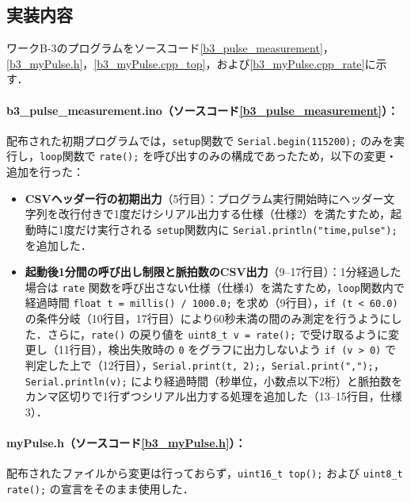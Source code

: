 \subsection{実装内容}

ワークB-3のプログラムをソースコード\ref{b3_pulse_measurement}，\ref{b3_myPulse.h}，\ref{b3_myPulse.cpp_top}，および\ref{b3_myPulse.cpp_rate}に示す．

\paragraph{b3\_pulse\_measurement.ino（ソースコード\ref{b3_pulse_measurement}）：}
配布された初期プログラムでは，\texttt{setup}関数で \texttt{Serial.begin(115200);} のみを実行し，\texttt{loop}関数で \texttt{rate();} を呼び出すのみの構成であったため，以下の変更・追加を行った：
\begin{itemize}
  \item \textbf{CSVヘッダー行の初期出力}（5行目）：プログラム実行開始時にヘッダー文字列を改行付きで1度だけシリアル出力する仕様（仕様2）を満たすため，起動時に1度だけ実行される \texttt{setup}関数内に \texttt{Serial.println("time,pulse");} を追加した．
  \item \textbf{起動後1分間の呼び出し制限と脈拍数のCSV出力}（9--17行目）：1分経過した場合は \texttt{rate} 関数を呼び出さない仕様（仕様4）を満たすため，\texttt{loop}関数内で経過時間 \texttt{float t = millis() / 1000.0;} を求め（9行目），\texttt{if (t < 60.0)} の条件分岐（10行目，17行目）により60秒未満の間のみ測定を行うようにした．さらに，\texttt{rate()} の戻り値を \texttt{uint8\_t v = rate();} で受け取るように変更し（11行目），検出失敗時の \texttt{0} をグラフに出力しないよう \texttt{if (v > 0)} で判定した上で（12行目），\texttt{Serial.print(t, 2);}，\texttt{Serial.print(",");}，\texttt{Serial.println(v);} により経過時間（秒単位，小数点以下2桁）と脈拍数をカンマ区切りで1行ずつシリアル出力する処理を追加した（13--15行目，仕様3）．
\end{itemize}

\paragraph{myPulse.h（ソースコード\ref{b3_myPulse.h}）：}
配布されたファイルから変更は行っておらず，\texttt{uint16\_t top();} および \texttt{uint8\_t rate();} の宣言をそのまま使用した．

